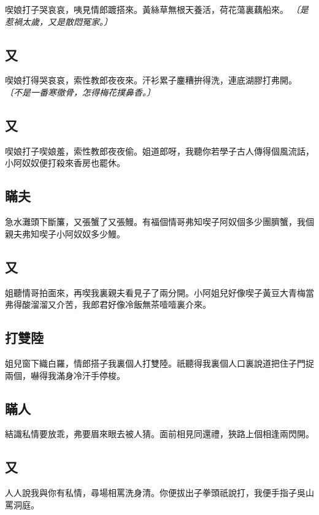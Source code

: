 喫娘打子哭哀哀，咦見情郎踱搭來。黃絲草無根天養活，荷花蕩裏藕船來。
\textit{〔是惹禍太歲，又是散悶冤家。〕}

\subsection*{又}

喫娘打得哭哀哀，索性教郎夜夜來。汗衫累子鏖糟拚得洗，連底湖膠打弗開。
\textit{〔不是一番寒徹骨，怎得梅花撲鼻香。〕}

\subsection*{又}

喫娘打子喫娘羞，索性教郎夜夜偷。姐道郎呀，我聽你若學子古人傳得個風流話，小阿奴奴便打殺來香房也罷休。

\subsection*{瞞夫}

急水灘頭下斷簾，又張蟹了又張鰻。有福個情哥弗知喫子阿奴個多少團臍蟹，我個親夫弗知喫子小阿奴奴多少鰻。

\subsection*{又}

姐聽情哥拍面來，再喫我裏親夫看見子了兩分開。小阿姐兒好像喫子黃豆大青梅當弗得酸溜溜又介苦，我郎君好像冷飯無茶噎噎裏介來。

\subsection*{打雙陸}

姐兒窗下織白羅，情郎搭子我裏個人打雙陸。祇聽得我裏個人口裏說道把住子門捉兩個，嚇得我滿身冷汗手停梭。

\subsection*{瞞人}

結識私情要放乖，弗要眉來眼去被人猜。面前相見同還禮，狹路上個相逢兩閃開。

\subsection*{又}

人人說我與你有私情，尋場相罵洗身清。你便拔出子拳頭祇說打，我便手指子吳山罵洞庭。

